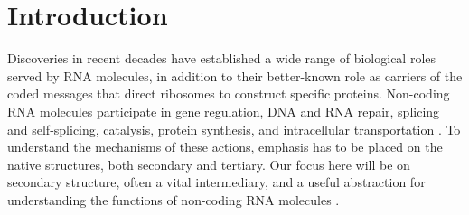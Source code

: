 \documentclass[10pt,letterpaper]{article}
\begin{document}
%
%

\linenumbers

\section*{Introduction}

Discoveries in recent decades have established a wide range of biological roles served by RNA molecules, in addition to their better-known role as carriers of the coded messages that direct ribosomes to construct specific proteins. Non-coding RNA molecules participate in gene regulation, DNA and RNA repair, splicing and self-splicing, catalysis, protein synthesis, and intracellular transportation \cite{Morris2014-iu,Kung2013-se}. To understand the mechanisms of these actions, emphasis has to be placed on the native structures, both secondary and tertiary. Our focus here will be on secondary structure, often a vital intermediary, and a useful abstraction for understanding the functions of non-coding RNA molecules \cite{Higgs2000-gj}.
\end{document}
